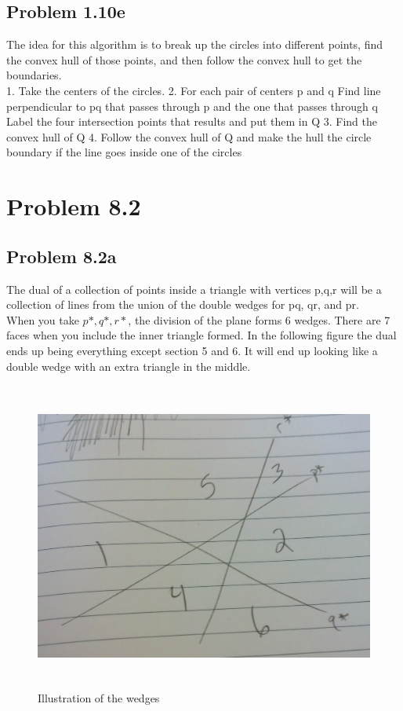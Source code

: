 \documentclass[11pt,psfig]{article}
\begin{document}
\subsection*{Problem 1.10e}

The idea for this algorithm is to break up the circles into different points, find the convex hull of those points, and then follow the convex hull to get the boundaries. 
\\
1. Take the centers of the circles.
2. For each pair of centers p and q
		Find line perpendicular to pq that passes through p and the one that passes through q
		Label the four intersection points that results and put them in Q
3. Find the convex hull of Q
4. Follow the convex hull of Q and make the hull the circle boundary if the line goes inside one of the circles


\section*{Problem 8.2}

\subsection*{Problem 8.2a}

The dual of a collection of points inside a triangle with vertices p,q,r will be a collection of lines from the union of the double wedges for pq, qr, and pr. 
\\
When you take $p*, q*, r*$, the division of the plane forms 6 wedges. There are 7 faces when you include the inner triangle formed. In the following figure the dual ends up being everything except section 5 and 6. It will end up looking like a double wedge with an extra triangle in the middle. 

\begin{figure}[H]
\centering
\includegraphics[height=4in]{cs266dual.jpg}
\caption{Illustration of the wedges}
\end{figure}
\end{document}
